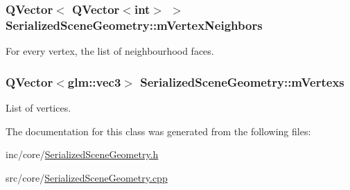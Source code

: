 \hypertarget{class_serialized_scene_geometry_a048df2ca66652a2b4150f289b6da459e}{
\subsubsection[{m\+Vertex\+Neighbors}]{\setlength{\rightskip}{0pt plus 5cm}Q\+Vector$<$ Q\+Vector$<$int$>$ $>$ Serialized\+Scene\+Geometry\+::m\+Vertex\+Neighbors\hspace{0.3cm}{\ttfamily [private]}}}\label{class_serialized_scene_geometry_a048df2ca66652a2b4150f289b6da459e}


For every vertex, the list of neighbourhood faces. 

\hypertarget{class_serialized_scene_geometry_a34ba752883c681daccd5ac0856bdf7ee}{
\subsubsection[{m\+Vertexs}]{\setlength{\rightskip}{0pt plus 5cm}Q\+Vector$<$glm\+::vec3$>$ Serialized\+Scene\+Geometry\+::m\+Vertexs\hspace{0.3cm}{\ttfamily [private]}}}\label{class_serialized_scene_geometry_a34ba752883c681daccd5ac0856bdf7ee}


List of vertices. 



The documentation for this class was generated from the following files\+:\begin{DoxyCompactItemize}
\item 
inc/core/\hyperlink{_serialized_scene_geometry_8h}{Serialized\+Scene\+Geometry.\+h}\item 
src/core/\hyperlink{_serialized_scene_geometry_8cpp}{Serialized\+Scene\+Geometry.\+cpp}\end{DoxyCompactItemize}
